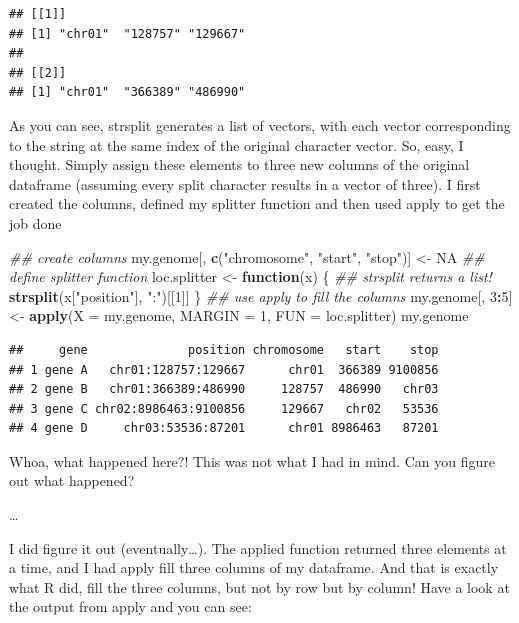 \documentclass[]{book}
\newenvironment{Shaded}{\begin{snugshade}}{\end{snugshade}}
\newcommand{\CommentTok}[1]{\textcolor[rgb]{0.56,0.35,0.01}{\textit{#1}}}
\newcommand{\ControlFlowTok}[1]{\textcolor[rgb]{0.13,0.29,0.53}{\textbf{#1}}}
\newcommand{\DataTypeTok}[1]{\textcolor[rgb]{0.13,0.29,0.53}{#1}}
\newcommand{\DecValTok}[1]{\textcolor[rgb]{0.00,0.00,0.81}{#1}}
\newcommand{\KeywordTok}[1]{\textcolor[rgb]{0.13,0.29,0.53}{\textbf{#1}}}
\newcommand{\NormalTok}[1]{#1}
\newcommand{\OperatorTok}[1]{\textcolor[rgb]{0.81,0.36,0.00}{\textbf{#1}}}
\newcommand{\OtherTok}[1]{\textcolor[rgb]{0.56,0.35,0.01}{#1}}
\newcommand{\StringTok}[1]{\textcolor[rgb]{0.31,0.60,0.02}{#1}}
\begin{document}
\begin{verbatim}
## [[1]]
## [1] "chr01"  "128757" "129667"
## 
## [[2]]
## [1] "chr01"  "366389" "486990"
\end{verbatim}

As you can see, strsplit generates a list of vectors, with each vector corresponding to the string at the same index of the original character vector.
So, easy, I thought. Simply assign these elements to three new columns of the original dataframe (assuming every split character results in a vector of three). I first created the columns, defined my splitter function and then used apply to get the job done

\begin{Shaded}
\begin{Highlighting}[]
\CommentTok{## create columns}
\NormalTok{my.genome[, }\KeywordTok{c}\NormalTok{(}\StringTok{"chromosome"}\NormalTok{, }\StringTok{"start"}\NormalTok{, }\StringTok{"stop"}\NormalTok{)] <-}\StringTok{ }\OtherTok{NA}
\CommentTok{## define splitter function}
\NormalTok{loc.splitter <-}\StringTok{ }\ControlFlowTok{function}\NormalTok{(x) \{}
    \CommentTok{## strsplit returns a list!}
    \KeywordTok{strsplit}\NormalTok{(x[}\StringTok{"position"}\NormalTok{], }\StringTok{":"}\NormalTok{)[[}\DecValTok{1}\NormalTok{]]}
\NormalTok{\}}
\CommentTok{## use apply to fill the columns}
\NormalTok{my.genome[, }\DecValTok{3}\OperatorTok{:}\DecValTok{5}\NormalTok{] <-}\StringTok{ }\KeywordTok{apply}\NormalTok{(}\DataTypeTok{X =}\NormalTok{ my.genome,}
                          \DataTypeTok{MARGIN =} \DecValTok{1}\NormalTok{,}
                          \DataTypeTok{FUN =}\NormalTok{ loc.splitter)}
\NormalTok{my.genome}
\end{Highlighting}
\end{Shaded}

\begin{verbatim}
##     gene              position chromosome   start    stop
## 1 gene A   chr01:128757:129667      chr01  366389 9100856
## 2 gene B   chr01:366389:486990     128757  486990   chr03
## 3 gene C chr02:8986463:9100856     129667   chr02   53536
## 4 gene D     chr03:53536:87201      chr01 8986463   87201
\end{verbatim}

Whoa, what happened here?! This was not what I had in mind. Can you figure out what happened?

\ldots{}

I did figure it out (eventually\ldots{}). The applied function returned three elements at a time, and I had apply fill three columns of my dataframe. And that is exactly what R did, fill the three columns, but not by row but by column! Have a look at the output from apply and you can see:
\end{document}
